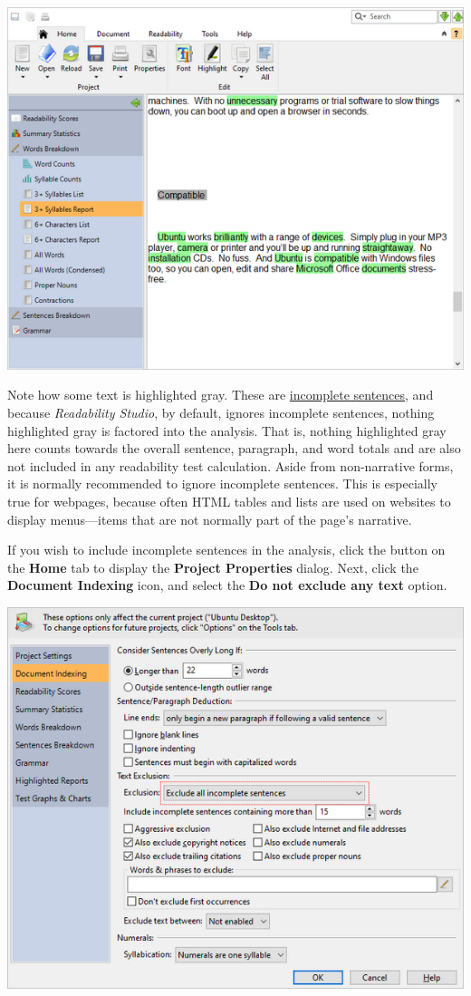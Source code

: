 \documentclass[
]{book}
\theoremstyle{definition}
\theoremstyle{definition}
\theoremstyle{definition}
\theoremstyle{definition}
\theoremstyle{remark}
\begin{document}
\includegraphics{Images/incompletesentences.png}

Note how some text is highlighted gray. These are \protect\hyperlink{how-text-is-excluded}{incomplete sentences}, and because \emph{Readability Studio}, by default, ignores incomplete sentences, nothing highlighted gray is factored into the analysis. That is, nothing highlighted gray here counts towards the overall sentence, paragraph, and word totals and are also not included in any readability test calculation. Aside from non-narrative forms, it is normally recommended to ignore incomplete sentences. This is especially true for webpages, because often HTML tables and lists are used on websites to display menus---items that are not normally part of the page's narrative.

If you wish to include incomplete sentences in the analysis, click the  button on the \textbf{Home} tab to display the \textbf{Project Properties} dialog. Next, click the \textbf{Document Indexing} icon, and select the \textbf{Do not exclude any text} option.

\includegraphics{Images/excludeincompletesentences.png}
\end{document}

